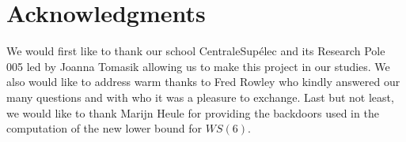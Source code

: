 \documentclass[3p]{elsarticle}
\newtheorem{computational theorem}[definition]{Computational Theorem}
\newcommand{\WS}{\mathit{WS}}
\begin{document}
\section{Acknowledgments}

\qquad We would first like to thank our school CentraleSupélec and its Research Pole 005 led by Joanna Tomasik allowing us to
make this project in our studies. We also would like to address warm thanks to Fred Rowley who kindly answered our many questions
and with who it was a pleasure to exchange. Last but not least, we would like to thank Marijn Heule for providing the backdoors
used in the computation of the new lower bound for \(\WS(6)\).






\end{document}
